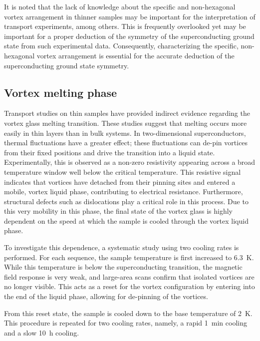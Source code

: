It is noted that the lack of knowledge about the specific and non-hexagonal vortex arrangement in thinner samples may be important for the interpretation of transport experiments, among others. This is frequently overlooked yet may be important for a proper deduction of the symmetry of the superconducting ground state from such experimental data. Consequently, characterizing the specific, non-hexagonal vortex arrangement is essential for the accurate deduction of the superconducting ground state symmetry\cite{zhangNonreciprocalSuperconductingNbSe22020,noatQuasiparticleSpectra22015}.

\subsection{Vortex melting phase}

Transport studies on thin  samples have provided indirect evidence regarding the vortex glass melting transition. These studies suggest that melting occurs more easily in thin layers than in bulk systems. In two-dimensional superconductors, thermal fluctuations have a greater effect; these fluctuations can de-pin vortices from their fixed positions and drive the transition into a liquid state\cite{zhangNonreciprocalSuperconductingNbSe22020}. Experimentally, this is observed as a non-zero resistivity appearing across a broad temperature window well below the critical temperature. This resistive signal indicates that vortices have detached from their pinning sites and entered a mobile, vortex liquid phase, contributing to electrical resistance. Furthermore, structural defects such as dislocations play a critical role in this process\cite{guillamonDirectObservationMelting2009}. Due to this very mobility in this phase, the final state of the vortex glass is highly dependent on the speed at which the sample is cooled through the vortex liquid phase\cite{jayaramProbingVortexDynamics2025}.

To investigate this dependence, a systematic study using two cooling rates is performed. For each sequence, the sample temperature is first increased to \qty{6.3}{\kelvin}. While this temperature is below the superconducting transition, the magnetic field response is very weak, and large-area scans confirm that isolated vortices are no longer visible. This acts as a reset for the vortex configuration by entering into the end of the liquid phase, allowing for de-pinning of the vortices.

From this reset state, the sample is cooled down to the base temperature of \qty{2}{\kelvin}. This procedure is repeated for two cooling rates, namely, a rapid \qty{1}{\minute} cooling and a slow \qty{10}{\hour} cooling.


